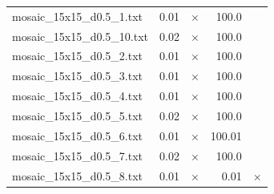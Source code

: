 \documentclass{article}
\begin{document}
\begin{center}
\begin{tabular}{lrrrr}
mosaic\_15x15\_d0.5\_1.txt & 0.01 & 
$\times$
 & 100.0 & 
\\
mosaic\_15x15\_d0.5\_10.txt & 0.02 & 
$\times$
 & 100.0 & 
\\
mosaic\_15x15\_d0.5\_2.txt & 0.01 & 
$\times$
 & 100.0 & 
\\
mosaic\_15x15\_d0.5\_3.txt & 0.01 & 
$\times$
 & 100.0 & 
\\
mosaic\_15x15\_d0.5\_4.txt & 0.01 & 
$\times$
 & 100.0 & 
\\
mosaic\_15x15\_d0.5\_5.txt & 0.02 & 
$\times$
 & 100.0 & 
\\
mosaic\_15x15\_d0.5\_6.txt & 0.01 & 
$\times$
 & 100.01 & 
\\
mosaic\_15x15\_d0.5\_7.txt & 0.02 & 
$\times$
 & 100.0 & 
\\
mosaic\_15x15\_d0.5\_8.txt & 0.01 & 
$\times$
 & 0.01 & 
$\times$
\\
\hline\end{tabular}
\end{center}
\end{document}
